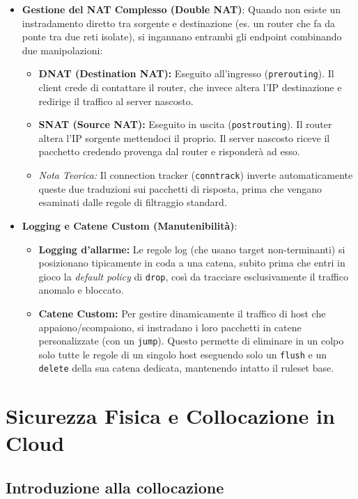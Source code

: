 \documentclass[12pt, a4paper]{report}
\begin{document}
\begin{itemize}
	\item \textbf{Gestione del NAT Complesso (Double NAT)}: Quando non esiste un instradamento diretto tra sorgente e destinazione (es. un router che fa da ponte tra due reti isolate), si ingannano entrambi gli endpoint combinando due manipolazioni:
	\begin{itemize}
		\item \textbf{DNAT (Destination NAT):} Eseguito all'ingresso (\texttt{prerouting}). Il client crede di contattare il router, che invece altera l'IP destinazione e redirige il traffico al server nascosto.
		\item \textbf{SNAT (Source NAT):} Eseguito in uscita (\texttt{postrouting}). Il router altera l'IP sorgente mettendoci il proprio. Il server nascosto riceve il pacchetto credendo provenga dal router e risponderà ad esso.
		\item \textit{Nota Teorica:} Il connection tracker (\texttt{conntrack}) inverte automaticamente queste due traduzioni sui pacchetti di risposta, prima che vengano esaminati dalle regole di filtraggio standard.
	\end{itemize}
	
	\item \textbf{Logging e Catene Custom (Manutenibilità)}:
	\begin{itemize}
		\item \textbf{Logging d'allarme:} Le regole log (che usano target non-terminanti) si posizionano tipicamente in coda a una catena, subito prima che entri in gioco la \textit{default policy} di \texttt{drop}, così da tracciare esclusivamente il traffico anomalo e bloccato.
		\item \textbf{Catene Custom:} Per gestire dinamicamente il traffico di host che appaiono/scompaiono, si instradano i loro pacchetti in catene personalizzate (con un \texttt{jump}). Questo permette di eliminare in un colpo solo tutte le regole di un singolo host eseguendo solo un \texttt{flush} e un \texttt{delete} della sua catena dedicata, mantenendo intatto il ruleset base.
	\end{itemize}
\end{itemize}

\chapter{Sicurezza Fisica e Collocazione in Cloud}

\section{Introduzione alla collocazione}
\end{document}
